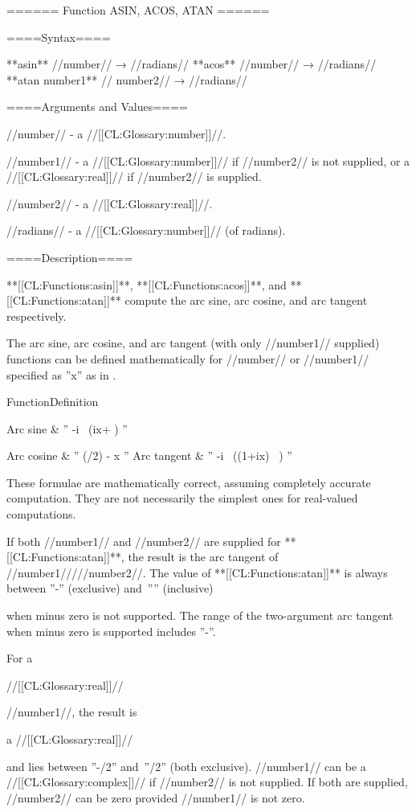 ====== Function ASIN, ACOS, ATAN ======

====Syntax====

**asin** //number// → //radians// **acos** //number// → //radians// **atan {number1** //\opt} number2// → //radians//

====Arguments and Values====

//number// - a //[[CL:Glossary:number]]//.

//number1// - a //[[CL:Glossary:number]]// if //number2// is not supplied, or a //[[CL:Glossary:real]]// if //number2// is supplied.

//number2// - a //[[CL:Glossary:real]]//.

//radians// - a //[[CL:Glossary:number]]// (of radians).

====Description====

**[[CL:Functions:asin]]**, **[[CL:Functions:acos]]**, and **[[CL:Functions:atan]]** compute the arc sine, arc cosine, and arc tangent respectively.

The arc sine, arc cosine, and arc tangent (with only //number1// supplied) functions can be defined mathematically for //number// or //number1// specified as ''x'' as in \thenextfigure.

 {Function}{Definition}{ Arc sine & '' -i\  \bigl(ix+  \bigr) '' \cr

Arc cosine & '' (\pi/2) -  x '' \cr Arc tangent & '' -i\  \bigl((1+ix)\  \bigr) '' \cr }

These formulae are mathematically correct, assuming completely accurate computation. They are not necessarily the simplest ones for real-valued computations.

If both //number1// and //number2// are supplied for **[[CL:Functions:atan]]**, the result is the arc tangent of //number1/////number2//. The value of **[[CL:Functions:atan]]** is always between ''-\pi'' (exclusive) and~''\pi'' (inclusive)

when minus zero is not supported. The range of the two-argument arc tangent when minus zero is supported includes ''-\pi''.


For a

//[[CL:Glossary:real]]//

//number1//, the result is

a //[[CL:Glossary:real]]//

and lies between ''-\pi/2'' and~''\pi/2'' (both exclusive). //number1// can be a //[[CL:Glossary:complex]]// if //number2// is not supplied. If both are supplied, //number2// can be zero provided //number1// is not zero. 

